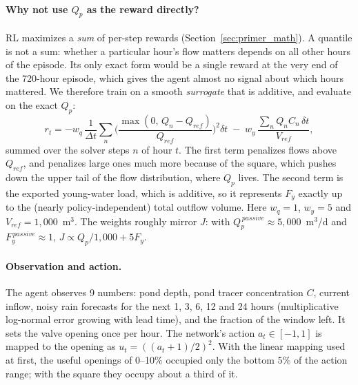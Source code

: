 \paragraph{Why not use $Q_p$ as the reward directly?} RL maximizes a
\emph{sum} of per-step rewards (Section~\ref{sec:primer_math}). A quantile
is not a sum: whether a particular hour's flow matters depends on all other
hours of the episode. Its only exact form would be a single reward at the
very end of the 720-hour episode, which gives the agent almost no signal
about which hours mattered. We therefore train on a smooth
\emph{surrogate} that is additive, and evaluate on the exact $Q_p$:
\[
r_t=-w_q\,\frac{1}{\Delta t}\sum_{n}\Big(\frac{\max(0,\,Q_n-Q_{ref})}{Q_{ref}}\Big)^2\delta t
\;-\;w_y\,\frac{\sum_n Q_n C_n\,\delta t}{V_{ref}},
\]
summed over the solver steps $n$ of hour $t$. The first term penalizes
flows above $Q_{ref}$, and penalizes large ones much more because of the
square, which pushes down the upper tail of the flow distribution, where
$Q_p$ lives. The second term is the exported young-water load, which is
additive, so it represents $F_y$ exactly up to the (nearly policy-independent)
total outflow volume. Here $w_q=1$, $w_y=5$ and $V_{ref}=1{,}000$~m$^3$. The
weights roughly mirror $J$: with $Q_p^{\,passive}\approx5{,}000$~m$^3$/d and
$F_y^{\,passive}\approx1$, $J\propto Q_p/1{,}000+5F_y$.

\paragraph{Observation and action.} The agent observes 9 numbers: pond
depth, pond tracer concentration $C$, current inflow, noisy rain forecasts
for the next 1, 3, 6, 12 and 24 hours (multiplicative log-normal error
growing with lead time), and the fraction of the window left. It sets the
valve opening once per hour. The network's action $a_t\in[-1,1]$ is mapped
to the opening as $u_t=((a_t+1)/2)^2$. With the linear mapping used at
first, the useful openings of 0--10\% occupied only the bottom 5\% of the
action range; with the square they occupy about a third of it.

